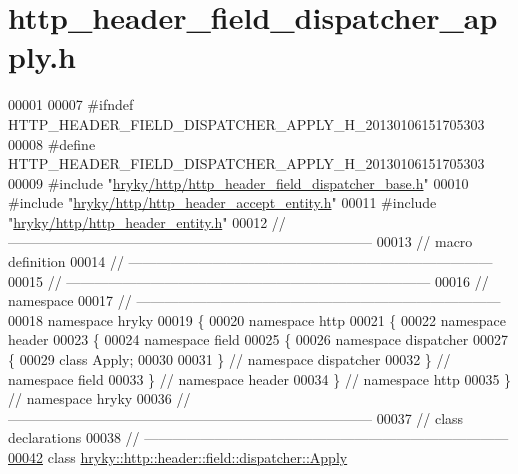 \hypertarget{http__header__field__dispatcher__apply_8h_source}{\section{http\-\_\-header\-\_\-field\-\_\-dispatcher\-\_\-apply.\-h}
}

\begin{DoxyCode}
00001 
00007 \textcolor{preprocessor}{#ifndef HTTP\_HEADER\_FIELD\_DISPATCHER\_APPLY\_H\_20130106151705303}
00008 \textcolor{preprocessor}{}\textcolor{preprocessor}{#define HTTP\_HEADER\_FIELD\_DISPATCHER\_APPLY\_H\_20130106151705303}
00009 \textcolor{preprocessor}{}\textcolor{preprocessor}{#include "\hyperlink{http__header__field__dispatcher__base_8h}{hryky/http/http_header_field_dispatcher_base.h}"}
00010 \textcolor{preprocessor}{#include "\hyperlink{http__header__accept__entity_8h}{hryky/http/http_header_accept_entity.h}"}
00011 \textcolor{preprocessor}{#include "\hyperlink{http__header__entity_8h}{hryky/http/http_header_entity.h}"}
00012 \textcolor{comment}{//
      ------------------------------------------------------------------------------}
00013 \textcolor{comment}{// macro definition}
00014 \textcolor{comment}{//
      ------------------------------------------------------------------------------}
00015 \textcolor{comment}{//
      ------------------------------------------------------------------------------}
00016 \textcolor{comment}{// namespace}
00017 \textcolor{comment}{//
      ------------------------------------------------------------------------------}
00018 \textcolor{keyword}{namespace }hryky
00019 \{
00020 \textcolor{keyword}{namespace }http
00021 \{
00022 \textcolor{keyword}{namespace }header
00023 \{
00024 \textcolor{keyword}{namespace }field
00025 \{
00026 \textcolor{keyword}{namespace }dispatcher
00027 \{
00029     \textcolor{keyword}{class }Apply;
00030 
00031 \} \textcolor{comment}{// namespace dispatcher}
00032 \} \textcolor{comment}{// namespace field}
00033 \} \textcolor{comment}{// namespace header}
00034 \} \textcolor{comment}{// namespace http}
00035 \} \textcolor{comment}{// namespace hryky}
00036 \textcolor{comment}{//
      ------------------------------------------------------------------------------}
00037 \textcolor{comment}{// class declarations}
00038 \textcolor{comment}{//
      ------------------------------------------------------------------------------}
\hypertarget{http__header__field__dispatcher__apply_8h_source_l00042}{}\hyperlink{classhryky_1_1http_1_1header_1_1field_1_1dispatcher_1_1_apply}{00042} \textcolor{comment}{}\textcolor{keyword}{class }\hyperlink{classhryky_1_1http_1_1header_1_1field_1_1dispatcher_1_1_apply}{hryky::http::header::field::dispatcher::Apply}

\end{DoxyCode}
